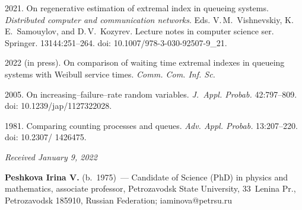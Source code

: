 \begin{multicols}{2}
{{\begin{thebibliography}{99}
 2021. On regenerative estimation of extremal 
index in queueing systems. 
\textit{Distributed computer and communication networks}. Eds. V.\,M.~Vishnevskiy,
K.\,E.~Samouylov, and D.\,V.~Kozyrev. 
Lecture notes in computer science ser. Springer. 13144:251--264. doi: 10.1007/978-3-030-92507-9\_21.

 2022 (in press).  
On comparison of waiting time extremal indexes  in queueing systems with Weibull service times. 
\textit{Comm. Com. Inf. Sc.} 


  2005.  On increasing--failure--rate random variables.
 \textit{J.~Appl. Probab.} 42:797--809. doi: 10.1239/jap/1127322028.


 1981. Comparing counting processes and queues. 
\textit{Adv. Appl. Probab.} 13:207--220.  doi: 10.2307/ 1426475.
\end{thebibliography}

 }
 }

\end{multicols}

\vspace*{-6pt}

\hfill{\small\textit{Received January 9, 2022}}



\Contr

\noindent
\textbf{Peshkova Irina V.} (b.\ 1975)~--- Candidate of Science (PhD) in physics
and mathematics, associate professor,
 Petrozavodsk State University, 33~Lenina Pr., Petrozavodsk 185910, Russian Federation;
\mbox{iaminova@petrsu.ru}

\label{end\stat}

\renewcommand{\bibname}{\protect\rm Литература} 
